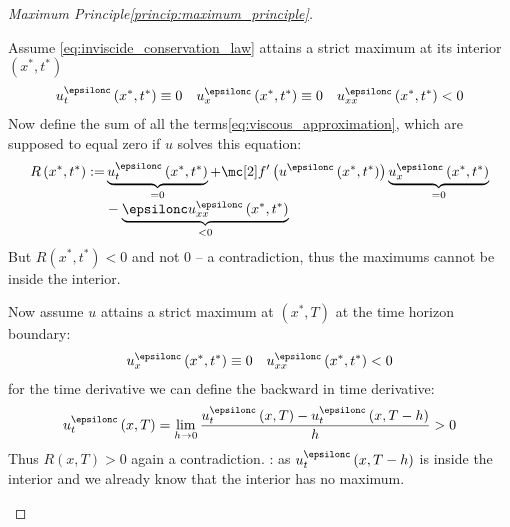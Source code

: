 \begin{proofbox}\nospacing
    \begin{proof}[Maximum Principle\cref{princip:maximum_principle}]\label{proof:princip:maximum_principle}\leavevmode
        \begin{circlelistnosep}
            \item Assume \cref{eq:inviscide_conservation_law} attains a strict maximum at its interior $\left(x^{*},t^{*}\right)$
            \begin{align*}
              u_{t}^{\epsilonc}\left(x^{*},t^{*}\right)\equiv0&&u_{x}^{\epsilonc}\left(x^{*},t^{*}\right)\equiv0
                                                            &&u_{xx}^{\epsilonc}\left(x^{*},t^{*}\right)<0
            \end{align*}
            Now define the sum of all the terms\cref{eq:viscous_approximation}, which are supposed to equal zero if $u$ solves this equation:
            \begin{align*}
              R\left(x^{*},t^{*}\right):=&\underbrace{u_{t}^{\epsilonc}\left(x^{*},t^{*}\right)}_{=0}+\flux'\left(u^{\epsilonc}\left(x^{*},t^{*}\right)\right)
                                           \underbrace{u_{x}^{\epsilonc}\left(x^{*},t^{*}\right)}_{=0}\\[-1\jot]
              &-\underbrace{\epsilonc u_{xx}^{\epsilonc}\left(x^{*},t^{*}\right)}_{<0}
            \end{align*}
            But $R\left(x^{*},t^{*}\right)<0$ and not $0$ -- a contradiction, thus the maximums cannot be inside the interior.
            \item Now assume $u$ attains a strict maximum at $\left(x^{*},T\right)$ at the time horizon boundary:
            \begin{align*}
              u_{x}^{\epsilonc}\left(x^{*},t^{*}\right)\equiv0&&u_{xx}^{\epsilonc}\left(x^{*},t^{*}\right)<0
            \end{align*}
            for the time derivative we can define the backward in time derivative:
            \begin{align*}
              u_{t}^{\epsilonc}\left(x, T\right)=\lim_{h\to0}\frac{u_{t}^{\epsilonc}\left(x,T\right)-u_{t}^{\epsilonc}\left(x,T-h\right)}{h}>0
            \end{align*}
            Thus $R\left(x, T\right)>0$ again a contradiction.
            : as $u_{t}^{\epsilonc}\left(x,T-h\right)$ is inside the interior and we already know that the interior has no maximum.
            \begin{figure}[H]
                \centering{
                  \def\svgwidth{180pt}
                  \resizebox{0.6\linewidth}{!}{}
                }
            \end{figure}
        \end{circlelistnosep}
    \end{proof}
\end{proofbox}

